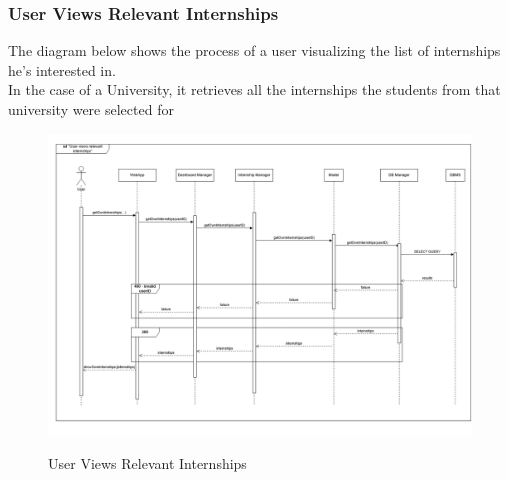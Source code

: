 \documentclass[a4paper,12pt]{article}
\begin{document}
\subsubsection*{User Views Relevant Internships}
The diagram below shows the process of a user visualizing the list of internships he's interested in. \\
In the case of a University, it retrieves all the internships the students from that university were selected for
\begin{figure}[H]
\centering
\includegraphics[scale = 0.4]{DD_figures/RuntimeView/UserViewsRelevantInternshipsRV.png}\\
\caption{User Views Relevant Internships}
\end{figure}

\newpage
\end{document}
